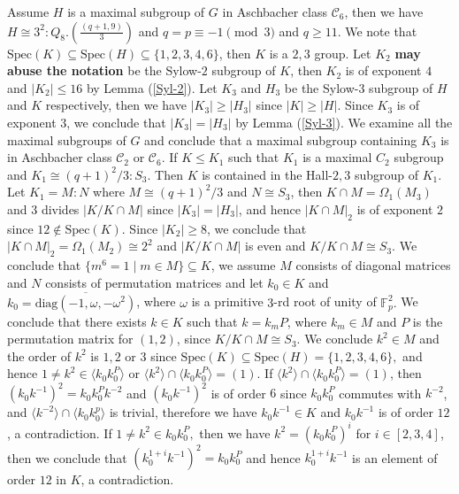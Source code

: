 \documentclass[12pt,reqno]{amsart}
\newcommand{\FF}{\mathbb{F}}
\newcommand{\lr}{\langle}
\newcommand{\rr}{\rangle}
\theoremstyle{plain}
\theoremstyle{definition}
\begin{document}
   Assume $H$ is a maximal subgroup of $G$ in Aschbacher class $\mathcal{C}_6$, then we have $H\cong 3^2{:}Q_8.(\frac{(q+1,9)}{3})$ and $q=p\equiv -1 \pmod 3$ and $q\ge 11$. 
   We note that $\mathrm{Spec}(K)\subseteq \mathrm{Spec}(H)\subseteq\{1,2,3,4,6\}$, then $K$ is a $2,3$ group. Let $K_2$ \textbf{may abuse the notation} be the Sylow-$2$ subgroup of $K$, then $K_2$ is of exponent $4$ and $|K_2|\le 16$ by Lemma (\ref{Syl-2}).
   Let $K_3$ and $H_3$ be the Sylow-$3$ subgroup of $H$ and $K$ respectively, then we have $|K_3|\ge |H_3|$ since $|K|\ge |H|$. Since $K_3$ is of exponent $3$, we conclude that $|K_3|=|H_3|$ by Lemma (\ref{Syl-3}).
   We examine all the maximal subgroups of $G$ and conclude that a maximal subgroup containing $K_3$ is in Aschbacher class $\mathcal{C}_2$ or $\mathcal{C}_6$. 
   If $K\le K_1$ such that $K_1$ is a maximal $C_2$ subgroup and $K_1\cong (q+1)^2/3{:}S_3$. Then $K$ is contained in the Hall-${2,3}$ subgroup of $K_1.$ 
   Let $K_1=M{:}N$ where $M\cong (q+1)^2/3$ and $N\cong S_3$, then $K\cap M=\Omega_1(M_3)$ and $3$ divides $|K/K\cap M|$ since $|K_3|=|H_3|$, and hence $|K\cap M|_2$ is of exponent $2$ since $12\notin \mathrm{Spec}(K).$
   Since $|K_2|\ge 8$, we conclude that $|K\cap M|_2=\Omega_1(M_2)\cong 2^2$ and $|K/K\cap M|$ is even and $K/K\cap M\cong S_3.$ 
   We conclude that $\{m^6=1 \mid m\in M\}\subseteq K$, we assume $M$ consists of diagonal matrices and $N$ consists of permutation matrices and let $k_0\in K$ and $k_0=\overline{\mathrm{diag}(-1,\omega,-\omega^2)}$, where $\omega$ is a primitive $3$-rd root of unity of $\FF_p^2.$  
   We conclude that there exists $k\in K$ such that $k=k_mP$, where $k_m\in M$ and $P$ is the permutation matrix for $(1,2)$, since $K/K\cap M\cong S_3.$ 
   We conclude $k^2\in M$ and the order of $k^2$ is $1,2$ or $3$ since $\mathrm{Spec}(K)\subseteq \mathrm{Spec}(H)=\{1,2,3,4,6\},$ and hence $1\neq k^2\in \lr k_0k_0^P \rr$ or $\lr k^2 \rr \cap \lr k_0k_0^P \rr=(1)$.
   If $\lr k^2 \rr \cap  \lr k_0k_0^P \rr=(1)$, then $(k_0k^{-1})^2=k_0k_0^Pk^{-2}$ and $(k_0k^{-1})^2$ is of order $6$ since $k_0k_0^P$ commutes with $k^{-2}$, and $\lr k^{-2} \rr \cap \lr k_0k_0^p \rr$ is trivial, therefore we have $k_0k^{-1}\in K$ and $k_0k^{-1}$ is of order $12$, a contradiction.
   If $1\neq k^2\in k_0k_0^P,$ then we have $k^2=(k_0k_0^P)^i$ for $i\in [2,3,4]$, then we conclude that $(k_0^{1+i}k^{-1})^2=k_0k_0^P$ and hence $k_0^{1+i}k^{-1}$ is an element of order $12$ in $K$, a contradiction. 
   
\end{document}
